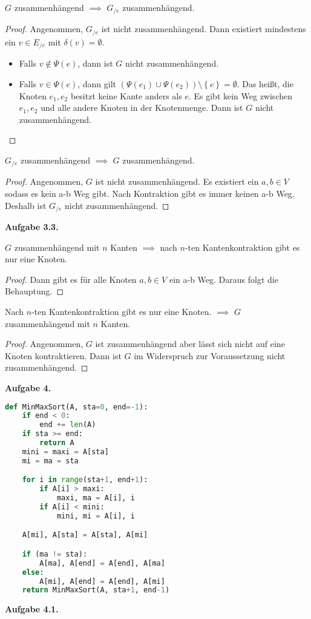 \documentclass[12pt]{extarticle}
\newcommand{\aufgn}[1]{\textbf{Aufgabe #1.}}
\begin{document}
\(G\) zusammenhängend \(\implies\) \(G_{/e}\) zusammenhängend.
\begin{proof}
  Angenommen, \(G_{/e}\) ist nicht zusammenhängend.  Dann existiert
  mindestens ein \(v \in E_{/e}\) mit \(\delta(v) = \emptyset\).
  \begin{itemize}
  \item   Falls \(v \notin \Psi(e)\), dann ist \(G\) nicht
    zusammenhängend.
  \item   Falls \(v \in \Psi(e)\), dann gilt
  $(\Psi(e_1) \cup \Psi(e_2)) \setminus \left\{ e \right\} =
  \emptyset$.  Das heißt, die Knoten \(e_1, e_2\) besitzt keine Kante
  anders als \(e\).  Es gibt kein Weg zwischen \(e_1, e_2\) und alle
  andere Knoten in der Knotenmenge.  Dann ist \(G\) nicht
  zusammenhängend.
  \end{itemize}
\end{proof}
\(G_{/e}\) zusammenhängend \(\implies\) \(G\) zusammenhängend.

\begin{proof}
  Angenommen, \(G\) ist nicht zusammenhängend.  Es existiert ein $a, b
  \in V$ sodass es kein a-b Weg gibt.  Nach Kontraktion gibt es immer
  keinen a-b Weg.  Deshalb ist \(G_{/e}\) nicht zusammenhängend.
\end{proof}

\aufgn{3.3}

\(G\) zusammenhängend mit \(n\) Kanten \(\implies\) nach \(n\)-ten
Kantenkontraktion gibt es nur eine Knoten.

\begin{proof}
  Dann gibt es für alle Knoten \(a, b \in V\) ein a-b Weg.  Daraus folgt
  die Behauptung.
\end{proof}

Nach \(n\)-ten Kantenkontraktion gibt es nur eine Knoten. \(\implies\) \(G\)
zusammenhängend mit \(n\) Kanten.

\begin{proof}
  Angenommen, \(G\) ist zusammenhängend aber lässt sich nicht auf eine
  Knoten kontraktieren.  Dann ist \(G\) im Widerspruch zur Voraussetzung
  nicht zusammenhängend.
\end{proof}
\newpage
\aufgn{4}
\begin{lstlisting}[language=Python]
def MinMaxSort(A, sta=0, end=-1):
    if end < 0:
        end += len(A)
    if sta >= end:
        return A
    mini = maxi = A[sta]
    mi = ma = sta

    for i in range(sta+1, end+1):
        if A[i] > maxi:
            maxi, ma = A[i], i
        if A[i] < mini:
            mini, mi = A[i], i

    A[mi], A[sta] = A[sta], A[mi]

    if (ma != sta):
        A[ma], A[end] = A[end], A[ma]
    else:
        A[mi], A[end] = A[end], A[mi]
    return MinMaxSort(A, sta+1, end-1)
\end{lstlisting}
\aufgn{4.1}
\end{document}
